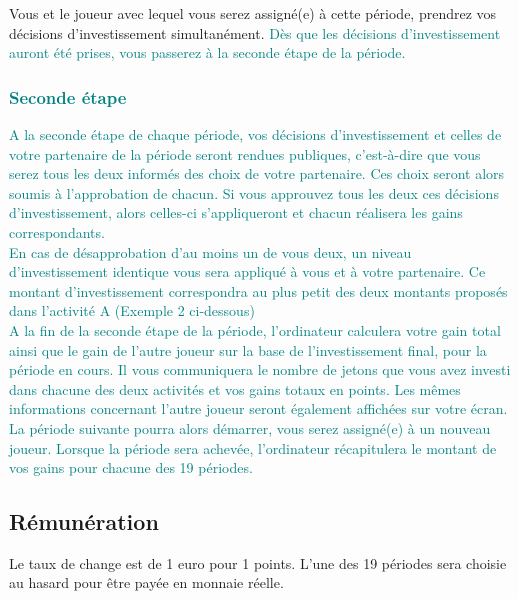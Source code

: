 \documentclass[12pt]{article}
\newcommand{\periods}{19 }
\newcommand{\convertECU}{1 }
\begin{document}
\noindent Vous et le joueur avec lequel vous serez assigné(e) à cette période, prendrez vos décisions d’investissement simultanément. \textcolor{teal}{Dès que les décisions d’investissement auront été prises, vous passerez à la seconde étape de la période.}

\subsubsection*{\textcolor{teal}{Seconde étape}}

\textcolor{teal}{\noindent A la seconde étape de chaque période, vos décisions d'investissement et celles de votre partenaire de la période seront rendues publiques, c'est-à-dire que vous serez tous les deux informés des choix de votre partenaire. Ces choix seront alors soumis à l'approbation de chacun. Si vous approuvez tous les deux ces décisions d'investissement, alors celles-ci s'appliqueront et chacun réalisera les gains correspondants.}\\

\textcolor{teal}{\noindent En cas de désapprobation d'au moins un de vous deux, un niveau d'investissement identique vous sera appliqué à vous et à votre partenaire. Ce montant d'investissement correspondra au plus petit des deux montants proposés dans l'activité A (Exemple 2 ci-dessous)}\\

\textcolor{teal}{\noindent A la fin de la seconde étape de la période, l’ordinateur calculera votre gain total ainsi que le gain de l'autre joueur sur la base de l'investissement final, pour la période en cours. Il vous communiquera le nombre de jetons que vous avez investi dans chacune des deux activités et vos gains totaux en points. Les mêmes informations concernant l'autre joueur seront également affichées sur votre écran. La période suivante pourra alors démarrer, vous serez assigné(e) à un nouveau joueur. Lorsque la  période sera achevée, l’ordinateur récapitulera le montant de vos gains pour chacune des \periods périodes.}\\





\subsection*{Rémunération}

 \noindent Le taux de change est de 1 euro pour \convertECU points. L'une des \periods périodes sera choisie au hasard pour être payée en monnaie réelle.
\end{document}
